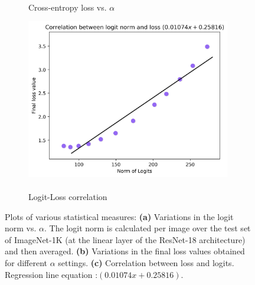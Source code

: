 \documentclass[times,sort&compress]{elsarticle}
\begin{document}
\begin{figure}[t]
\begin{subfigure}{0.33\textwidth}
\caption{\\Cross-entropy loss vs. $\alpha$}
\end{subfigure}%
\begin{subfigure}{0.33\textwidth}
\centering
\includegraphics[width=0.98\textwidth]{logit_vs_loss}
\caption{\\Logit-Loss correlation}
\end{subfigure}
\caption{ Plots of various statistical measures: \textbf{(a)} Variations in the logit
norm vs. $\alpha$. The logit norm is calculated per image over the test set of
ImageNet-1K (at the linear layer of the ResNet-18 architecture) and then averaged.
\textbf{(b)} Variations in the final loss values obtained for different $\alpha$
settings. \textbf{(c)} Correlation between loss and logits. Regression line equation
:$(0.01074 x + 0.25816)$. }
\label{fig:stats}
\end{figure}
\end{document}
